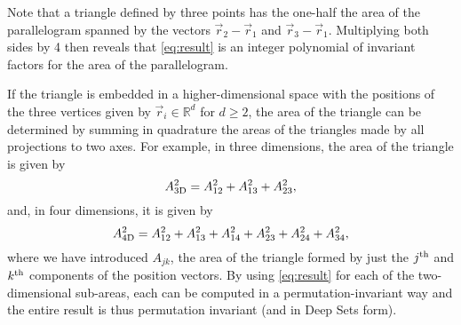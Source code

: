 \documentclass[12pt]{article}
\begin{document}




Note that a triangle defined by three points has the one-half the area of the parallelogram spanned by the vectors $\vec{r}_2 - \vec{r}_1$ and $\vec{r}_3 - \vec{r}_1$. Multiplying both sides by 4 then reveals that \eqref{eq:result} is an integer polynomial of invariant factors for the area of the parallelogram.

If the triangle is embedded in a higher-dimensional space with the positions of the three vertices given by $\vec{r}_i \in \mathbb{R}^{d}$ for $d \geq 2$, the area of the triangle can be determined by summing in quadrature the areas of the triangles made by all projections to two axes. For example, in three dimensions, the area of the triangle is given by
\begin{equation}
    A_{\rm 3D}^2 =
    A_{12}^2 + A_{13}^2 + A_{23}^2,
\end{equation}
and, in four dimensions, it is given by
\begin{equation}
    A_{\rm 4D}^2 =
    A_{12}^2 + A_{13}^2 + A_{14}^2
    + A_{23}^2 + A_{24}^2
    + A_{34}^2,
\end{equation}
where we have introduced $A_{jk}$, the area of the triangle formed by just the $j^{\rm th}$ and $k^{\rm th}$ components of the position vectors. By using \eqref{eq:result} for each of the two-dimensional sub-areas, each can be computed in a permutation-invariant way and the entire result is thus permutation invariant (and in Deep Sets form).
\end{document}
